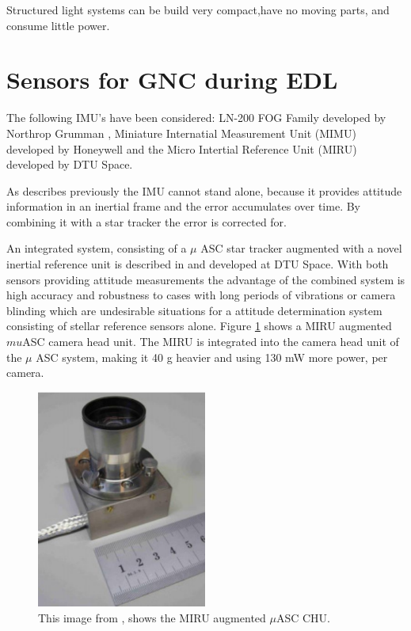 Structured light systems can be build very compact,have no moving parts, and consume little power. 






\section{Sensors for GNC during EDL}


The following IMU's have been considered: 
LN-200 FOG Family developed by Northrop Grumman \cite{http://www.northropgrumman.com/Capabilities/LN200FOG/Documents/ln200.pdf}, Miniature Internatial Measurement Unit (MIMU) developed by Honeywell \cite{http://www51.honeywell.com/aero/common/documents/myaerospacecatalog-documents/MIMU.pdf} and the Micro Intertial Reference Unit (MIRU) developed by DTU Space.

As describes previously the IMU cannot stand alone, because it provides attitude information in an inertial frame and the error accumulates over time. By combining it with a star tracker the error is corrected for. 


An integrated system, consisting of a $\mu$ ASC star tracker augmented with a novel inertial reference unit is described in \cite{Bjarno} and developed at DTU Space. With both sensors providing attitude measurements the advantage of the combined system is high accuracy and robustness to cases with long periods of vibrations or camera blinding which are undesirable situations for a attitude determination system consisting of stellar reference sensors alone. Figure \ref{miruasc} shows a MIRU augmented $mu$ASC camera head unit. The MIRU is integrated into the camera head unit of the $\mu$ ASC system, making it 40 g heavier and using 130 mW more power, per camera. 

\begin{figure}
\begin{center}
\includegraphics[width=0.5\textwidth]{figures/navtheory/chumiro}
\caption{This image from \cite{mirosheet}, shows the MIRU augmented $\mu$ASC CHU.}
\label{miruasc}
\end{center}
\end{figure}

